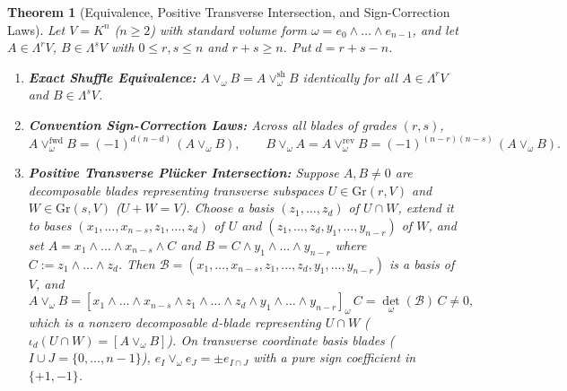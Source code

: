 \documentclass[11pt]{article}
\newtheorem{theorem}{Theorem}[section]
\theoremstyle{definition}
\newcommand{\Gr}{\mathrm{Gr}}
\begin{document}
\begin{theorem}[Equivalence, Positive Transverse Intersection, and Sign-Correction Laws]\label{thm:transverse}
Let $V = K^n$ ($n \ge 2$) with standard volume form $\omega = e_0 \wedge \dots \wedge e_{n-1}$, and let $A \in \Lambda^r V$, $B \in \Lambda^s V$ with $0 \le r, s \le n$ and $r + s \ge n$. Put $d = r + s - n$.
\begin{enumerate}
  \item \textbf{Exact Shuffle Equivalence:} $A \vee_\omega B = A \vee_\omega^{\mathrm{sh}} B$ identically for all $A \in \Lambda^r V$ and $B \in \Lambda^s V$.
  \item \textbf{Convention Sign-Correction Laws:} Across all blades of grades $(r,s)$,
  \begin{equation}\label{eq:sign-laws}
    A \vee_\omega^{\mathrm{fwd}} B = (-1)^{d(n-d)}\,(A \vee_\omega B), \qquad
    B \vee_\omega A = A \vee_\omega^{\mathrm{rev}} B = (-1)^{(n-r)(n-s)}\,(A \vee_\omega B).
  \end{equation}
  \item \textbf{Positive Transverse Pl\"ucker Intersection:} Suppose $A, B \neq 0$ are decomposable blades representing transverse subspaces $U \in \Gr(r,V)$ and $W \in \Gr(s,V)$ ($U + W = V$). Choose a basis $(z_1, \dots, z_d)$ of $U \cap W$, extend it to bases $(x_1, \dots, x_{n-s}, z_1, \dots, z_d)$ of $U$ and $(z_1, \dots, z_d, y_1, \dots, y_{n-r})$ of $W$, and set $A = x_1 \wedge \dots \wedge x_{n-s} \wedge C$ and $B = C \wedge y_1 \wedge \dots \wedge y_{n-r}$ where $C := z_1 \wedge \dots \wedge z_d$. Then $\mathcal{B} = (x_1, \dots, x_{n-s}, z_1, \dots, z_d, y_1, \dots, y_{n-r})$ is a basis of $V$, and
  \begin{equation}\label{eq:adapted-meet}
    A \vee_\omega B = [x_1 \wedge \dots \wedge x_{n-s} \wedge z_1 \wedge \dots \wedge z_d \wedge y_1 \wedge \dots \wedge y_{n-r}]_\omega \, C = \det_\omega(\mathcal{B})\, C \neq 0,
  \end{equation}
  which is a nonzero decomposable $d$-blade representing $U \cap W$ ($\iota_d(U \cap W) = [A \vee_\omega B]$). On transverse coordinate basis blades ($I \cup J = \{0,\dots,n-1\}$), $e_I \vee_\omega e_J = \pm e_{I \cap J}$ with a pure sign coefficient in $\{+1,-1\}$.
\end{enumerate}
\end{theorem}
\end{document}
